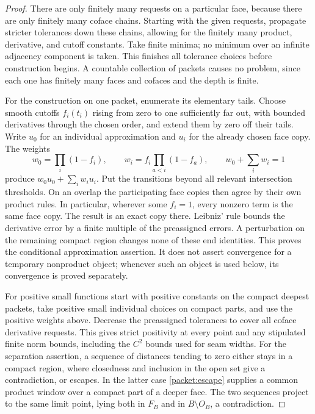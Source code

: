 \documentclass[11pt]{article}
\numberwithin{equation}{section}
\theoremstyle{definition}
\theoremstyle{remark}
\begin{document}
\begin{proof}
There are only finitely many requests on a particular face, because
there are only finitely many coface chains.  Starting with the given
requests, propagate stricter tolerances down these chains, allowing
for the finitely many product, derivative, and cutoff constants.
Take finite minima; no minimum over an infinite adjacency component
is taken.  This finishes all tolerance choices before construction
begins.  A countable collection of packets causes no problem, since
each one has finitely many faces and cofaces and the depth is finite.

For the construction on one packet, enumerate its elementary tails.
Choose smooth cutoffs $f_i(t_i)$ rising from zero to one sufficiently
far out, with bounded derivatives through the chosen order, and
extend them by zero off their tails.  Write $u_0$ for an individual
approximation and $u_i$ for the already chosen face copy.  The weights
\begin{equation}\label{packet:blend}
 w_0=\prod_i(1-f_i),\qquad
 w_i=f_i\prod_{a<i}(1-f_a),\qquad
 w_0+\sum_iw_i=1
\end{equation}
produce $w_0u_0+\sum_iw_iu_i$.  Put the transitions beyond all relevant
intersection thresholds.  On an overlap the participating face copies
then agree by their own product rules.  In particular, wherever some
$f_i=1$, every nonzero term is the same face copy.  The result is an
exact copy there.  Leibniz' rule bounds the derivative error by a finite
multiple of the preassigned errors.  A perturbation on the remaining
compact region changes none of these end identities.
This proves the conditional approximation assertion.  It does not
assert convergence for a temporary nonproduct object; whenever such
an object is used below, its convergence is proved separately.

For positive small functions start with positive constants on the
compact deepest packets, take positive small individual choices on
compact parts, and use the positive weights above.  Decrease the
preassigned tolerances to cover all coface derivative requests.
This gives strict positivity at every point and any stipulated finite
norm bounds, including the $C^2$ bounds used for seam widths.
For the separation assertion, a sequence of distances tending to
zero either stays in a compact region, where closedness and inclusion
in the open set give a contradiction, or escapes.  In the latter case
\cref{packet:escape} supplies a common product window over a compact
part of a deeper face.  The two sequences project to the same limit
point, lying both in $F_B$ and in $B\setminus O_B$, a contradiction.
\end{proof}
\end{document}
